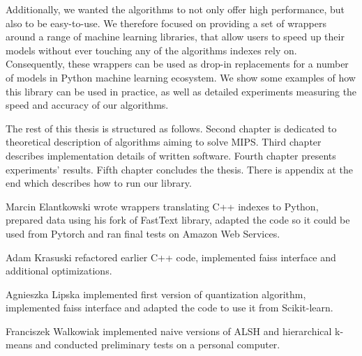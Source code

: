 Additionally, we wanted the algorithms to not only offer high performance, but also to be easy-to-use. We therefore
focused on providing a set of wrappers around a range of machine learning libraries, that allow users to 
speed up their models without ever touching any of the algorithms indexes rely on. Consequently,
these wrappers can be used as drop-in replacements for a number of models in Python machine learning ecosystem.
We show some examples of how this library can be used in practice,
as well as detailed experiments measuring the speed and accuracy of our algorithms.

The rest of this thesis is structured as follows.
Second chapter is dedicated to theoretical description of algorithms aiming to solve MIPS.
Third chapter describes implementation details of written software.
Fourth chapter presents experiments' results.
Fifth chapter concludes the thesis.
There is appendix at the end which describes how to run our library.

Marcin Elantkowski wrote wrappers translating C++ indexes to Python, prepared data using his fork of FastText library, adapted the code so it could be used from Pytorch and ran final tests on Amazon Web Services.

Adam Krasuski refactored earlier C++ code, implemented faiss interface and additional optimizations.

Agnieszka Lipska implemented first version of quantization algorithm, implemented faiss interface and adapted the code to use it from Scikit-learn.

Franciszek Walkowiak implemented naive versions of ALSH and hierarchical \mbox{k-means} and conducted preliminary tests on a personal computer.
